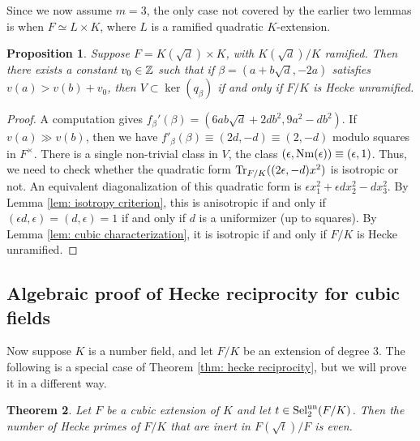 \documentclass[11pt,a4paper]{amsart}
\def\Z{{\rm \mathbb{Z}}}
\def\Nm{{\rm Nm}}
\def\un{{\rm un}}
\def\Tr{{\rm Tr}}
\def\Sel{{\rm Sel}}
\numberwithin{equation}{section}
\newtheorem{theorem}{Theorem}[section]
\newtheorem{proposition}[theorem]{Proposition}
\begin{document}
Since we now assume $m = 3$, the only case not covered by the earlier two lemmas  is when $F \simeq L \times K$, where $L$ is a ramified quadratic $K$-extension.  


\begin{proposition}\label{prop: partially ramified cubic computation}
    Suppose $F = K(\sqrt{d}) \times K$, with $K(\sqrt{d})/K$ ramified. Then there exists a constant $v_0 \in \Z$ such that  if $\beta = (a + b\sqrt{d},-2a)$ satisfies $v(a) > v(b) + v_0$, then $V \subset \ker(q_\beta)$ if and only if $F/K$ is Hecke unramified. 
\end{proposition}


\begin{proof}
    A computation gives $f_\beta'(\beta) = (6ab\sqrt{d} + 2d b^2, 9a^2 - d b^2)$. If $v(a) \gg v(b)$, then we have $f'_\beta(\beta) \equiv (2d, -d) \equiv (2,-d)$ modulo squares in $F^\times$. There is a single non-trivial class in $V$, the class $(\epsilon, \Nm(\epsilon)) \equiv (\epsilon,1)$. Thus, we need to check whether the quadratic form $\Tr_{F/K}((2\epsilon, -d)x^2)$ is isotropic or not. An equivalent diagonalization of this quadratic form is $\epsilon x_1^2 + \epsilon d x_2^2 - d x_3^2$. By Lemma \ref{lem: isotropy criterion}, this is anisotropic if and only if $(\epsilon d, \epsilon) = (d,\epsilon) = 1$ if and only if $d$ is a uniformizer (up to squares). By Lemma \ref{lem: cubic characterization}, it is isotropic if and only if $F/K$ is Hecke unramified.     
\end{proof}


\subsection{Algebraic proof of Hecke reciprocity for cubic fields}

Now suppose $K$ is a number field, and let $F/K$ be an extension of degree $3$. The following is a special case of Theorem \ref{thm: hecke reciprocity}, but we will prove it in a different way.

\begin{theorem}\label{thm: reciprocity law cubics}
    Let $F$ be a cubic extension of $K$ and let $t \in \Sel_2^\un(F/K)$. Then the number of 
 Hecke  primes of $F/K$ that are inert in $F(\sqrt{t})/F$ is even. 

\end{theorem}
\end{document}
